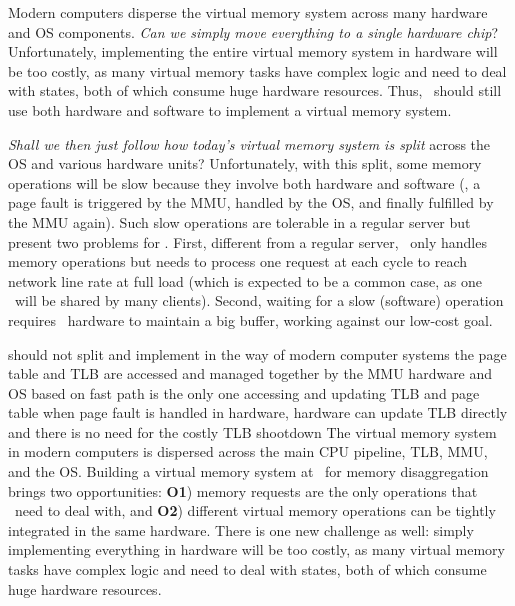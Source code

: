 Modern computers disperse the virtual memory system across many hardware and OS components.
\textit{Can we simply move everything to a single hardware chip}?
Unfortunately, implementing the entire virtual memory system in hardware will be too costly,
as many virtual memory tasks have complex logic and need to deal with states,
both of which consume huge hardware resources. %
Thus, \sysboard\ should still use both hardware and software to implement a virtual memory system.

\textit{Shall we then just follow how today's virtual memory system is split} across the OS and various hardware units?
Unfortunately, with this split, some memory operations will be slow because they involve both hardware and software
(\eg, a page fault is triggered by the MMU, handled by the OS, and finally fulfilled by the MMU again).
Such slow operations are tolerable in a regular server but present two problems for \sysboard.
First, different from a regular server, \sysboard\ only handles memory operations but needs to 
process one request at each cycle to reach network line rate 
at full load (which is expected to be a common case, as one \MN\ will be shared by many clients).
Second, waiting for a slow (software) operation requires \sysboard\ hardware to maintain a big buffer,
working against our low-cost goal.

should not split and implement in the way of modern computer systems
the page table and TLB are accessed and managed together by the MMU hardware and OS
based on 
fast path is the only one accessing and updating TLB and page table
when page fault is handled in hardware, hardware can update TLB directly
and there is no need for the costly TLB shootdown
The virtual memory system in modern computers is dispersed across the main CPU pipeline, TLB, MMU, and the OS.
%
Building a virtual memory system at \MN\ for memory disaggregation brings two opportunities:
{\bf O1}) memory requests are the only operations that \MN\ need to deal with,
and {\bf O2}) different virtual memory operations can be tightly integrated in the same hardware.
There is one new challenge as well: simply implementing everything in hardware
will be too costly, %
as many virtual memory tasks have complex logic and need to deal with states,
both of which consume huge hardware resources. %
\fi


